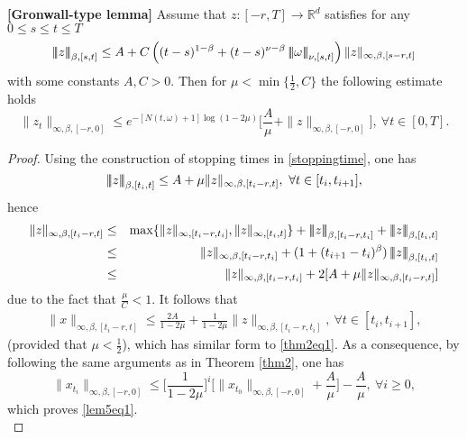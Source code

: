 \documentclass[graybox]{svmult}
\newcommand{\R}{\ensuremath{\mathbb{R}}}
\newcommand{\ltn}{\ensuremath{\left| \! \left| \! \left|}}
\newcommand{\rtn}{\ensuremath{\right| \! \right| \! \right|}}
\begin{document}

\begin{lemma}\label{lem5}{\bf [Gronwall-type lemma]}
	Assume that $z:[-r,T]\to\R^d$ satisfies for any $0\leq s \leq t \leq T$
	\begin{eqnarray}\label{basicassumption} 
	\ltn z\rtn_{\beta,[s,t]}\leq A+C\left((t-s)^{1-\beta}+(t-s)^{\nu-\beta}\ltn\omega\rtn_{\nu,[s,t]}\right)\| z\|_{\infty,\beta,[s-r,t]}
	\end{eqnarray}
	with some constants $A,C>0$. Then for $\mu<\min\{\frac{1}{2},C\}$  the following estimate holds %
	\begin{equation}\label{lem5eq1}
	\|z_t\|_{\infty,\beta,[-r,0]}\leq e^{-[N(t,\omega)+1]\log(1-2\mu)}\Big[\frac{A}{\mu} +\|z\|_{\infty,\beta,[-r,0]} \Big],\ \forall t\in [0,T]. 
	\end{equation}
\end{lemma}


\begin{proof} 
	Using the construction of stopping times in \eqref{stoppingtime}, one has
	\[
	\ltn z \rtn_{\beta,[t_i,t]} \leq A + \mu \|z\|_{\infty,\beta,[t_i-r,t]},\ \forall t \in [t_i,t_{i+1}], 
	\]
	hence
	\begin{eqnarray*}
		\|z\|_{\infty,\beta,[t_i-r,t]} &\leq& \max\{\|z\|_{\infty,[t_i-r,t_i]}, \| z \|_{\infty,[t_i,t]}\} + \ltn z \rtn_{\beta,[t_i-r,t_i]}+\ltn z \rtn_{\beta,[t_i,t]} \\
		&\leq&  \|z\|_{\infty,\beta,[t_i-r,t_i]} + (1+(t_{i+1}-t_i)^\beta) \ltn z\rtn_{\beta,[t_i,t]}\\
		&\leq& \|z\|_{\infty,\beta,[t_i-r,t_i]} + 2 [A + \mu \|z\|_{\infty,\beta,[t_i-r,t]}] 
	\end{eqnarray*}
	due to the fact that $\frac{\mu}{C}<1$. It follows that %
	\begin{eqnarray*}
		\|x\|_{\infty,\beta,[t_i-r,t]} \leq \frac{2A}{1-2\mu} + \frac{1}{1-2\mu}\| z \|_{\infty,\beta,[t_i-r,t_i]},\ \forall t \in [t_i,t_{i+1}],
	\end{eqnarray*}
	(provided that $\mu<\frac{1}{2}$), which has similar form to \eqref{thm2eq1}. As a consequence, by following the same arguments as in Theorem \ref{thm2}, one has
	\begin{equation*}
	\|x_{t_i}\|_{\infty,\beta,[-r,0]} \leq \Big[\frac{1}{1-2\mu}\Big]^i \Big[\|x_{t_0}\|_{\infty,\beta,[-r,0]} + \frac{A}{\mu}\Big] -\frac{A}{\mu},\ \forall i\geq 0,
	\end{equation*}
	which proves \eqref{lem5eq1}.\\
\end{proof}
\end{document}
